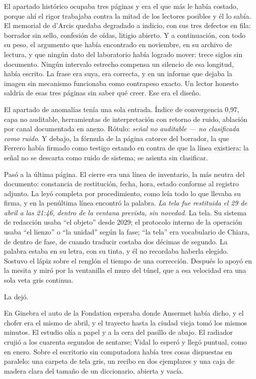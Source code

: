 El apartado histórico ocupaba tres páginas y era el que más le había costado, porque ahí el rigor trabajaba contra la mitad de los lectores posibles y él lo sabía. El memorial de d'Arcis quedaba degradado a indicio, con sus tres defectos en fila: borrador sin sello, confesión de oídas, litigio abierto. Y a continuación, con todo su peso, el argumento que había encontrado en noviembre, en su archivo de lectura, y que ningún dato del laboratorio había logrado mover: trece siglos sin documento. Ningún intervalo estrecho compensa un silencio de esa longitud, había escrito. La frase era suya, era correcta, y en un informe que dejaba la imagen sin mecanismo funcionaba como contrapeso exacto. Un lector honesto saldría de esas tres páginas sin saber qué creer. Ese era el diseño.

El apartado de anomalías tenía una sola entrada. Índice de convergencia 0,97, capa no auditable, herramientas de interpretación con retorno de ruido, ablación por canal documentada en anexo. Rótulo: \textit{señal no auditable --- no clasificada como ruido}. Y debajo, la fórmula de la página catorce del borrador, la que Ferrero había firmado como testigo estando en contra de que la línea existiera: la señal no se descarta como ruido de sistema; se asienta sin clasificar.

Pasó a la última página. El cierre era una línea de inventario, la más neutra del documento: constancia de restitución, fecha, hora, estado conforme al registro adjunto. La leyó completa por procedimiento, como leía todo lo que llevaba su firma, y en la penúltima línea encontró la palabra. \textit{La tela fue restituida el 29 de abril a las 21:46, dentro de la ventana prevista, sin novedad.} La tela. Su sistema de redacción usaba ``el objeto'' desde 2029; el protocolo interno de la operación usaba ``el lienzo'' o ``la unidad'' según la fase; ``la tela'' era vocabulario de Chiara, de dentro de fase, de cuando traducir costaba dos décimas de segundo. La palabra estaba en su letra, con su tinta, y él no recordaba haberla elegido. Sostuvo el lápiz sobre el renglón el tiempo de una corrección. Después lo apoyó en la mesita y miró por la ventanilla el muro del túnel, que a esa velocidad era una sola veta gris continua.

La dejó.

En Ginebra el auto de la Fondation esperaba donde Ansermet había dicho, y el chofer era el mismo de abril, y el trayecto hasta la ciudad vieja tomó los mismos minutos. El estudio olía a papel y a la cera del pasillo de abajo. El radiador crujió a los cuarenta segundos de sentarse; Vidal lo esperó y llegó puntual, como en enero. Sobre el escritorio sin computadora había tres cosas dispuestas en paralelo: una carpeta de tela gris, un recibo en dos ejemplares y una caja de madera clara del tamaño de un diccionario, abierta y vacía.

